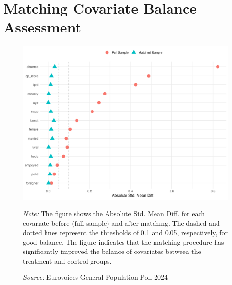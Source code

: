 \documentclass{article}
\begin{document}
\newpage
\section{Matching Covariate Balance Assessment}
\label{appendix:c}
\begin{figure}[htbp]
\centering
\includegraphics[width=\textwidth]{"viz/loveplot.png"}

\medskip
\justifying\footnotesize 
\textit{Note:} The figure shows the Absolute Std. Mean Diff. for each covariate before (full sample) and after matching. The dashed and dotted lines represent the thresholds of 0.1 and 0.05, respectively, for good balance. The figure indicates that the matching procedure has significantly improved the balance of covariates between the treatment and control groups.

\textit{Source:} Eurovoices General Population Poll 2024
\end{figure}

\newpage
\end{document}
